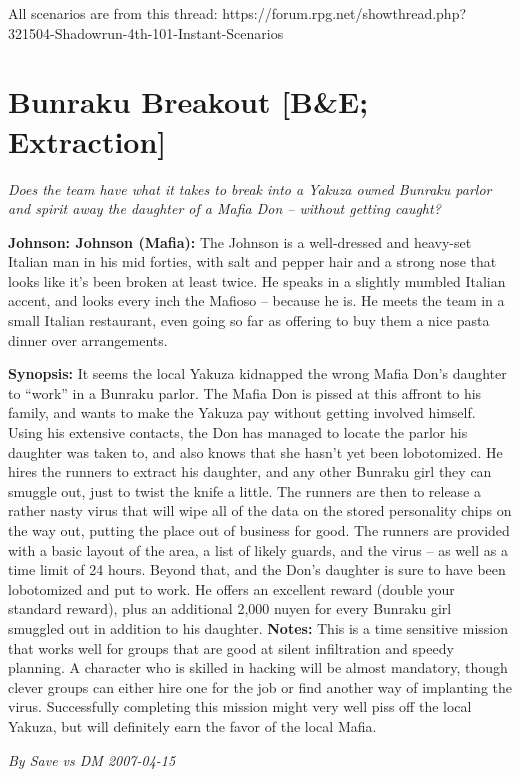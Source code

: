 \documentclass[letterpaper,twocolumn,10.5pt]{article}
\newenvironment{scenario}[6]
	{
		\section{#1 {\small[#2]}}
		\textit{#3}
		\def\TMPSCENARIO{#4 #5}
	}
	{\small\textit{By \TMPSCENARIO}}
\newcommand{\johnson}[2]{\textbf{Johnson: #1 (#2):}}
\newcommand{\synopsis}{\textbf{Synopsis: }}
\newcommand{\notes}{\textbf{Notes: }}
\begin{document}
All scenarios are from this thread: https://forum.\allowbreak{}rpg.\allowbreak{}net/\allowbreak{}showthread.\allowbreak{}php?\allowbreak{}321504-\allowbreak{}Shadowrun-\allowbreak{}4th-\allowbreak{}101-\allowbreak{}Instant-\allowbreak{}Scenarios

\tableofcontents

\begin{scenario}{Bunraku Breakout}
	{B\&E; Extraction}
	{Does the team have what it takes to break into a Yakuza owned Bunraku parlor and spirit away the daughter of a Mafia Don – without getting caught?}
	{Save vs DM}
	{2007-04-15}
	{https://forum.rpg.net/showthread.php?321504-Shadowrun-4th-101-Instant-Scenarios\&p=7171841#post7171841}

\johnson{Johnson}{Mafia} The Johnson is a well-dressed and heavy-set Italian man in his mid forties, with salt and pepper hair and a strong nose that looks like it’s been broken at least twice. He speaks in a slightly mumbled Italian accent, and looks every inch the Mafioso – because he is. He meets the team in a small Italian restaurant, even going so far as offering to buy them a nice pasta dinner over arrangements.

\synopsis It seems the local Yakuza kidnapped the wrong Mafia Don’s daughter to “work” in a Bunraku parlor. The Mafia Don is pissed at this affront to his family, and wants to make the Yakuza pay without getting involved himself. Using his extensive contacts, the Don has managed to locate the parlor his daughter was taken to, and also knows that she hasn’t yet been lobotomized. He hires the runners to extract his daughter, and any other Bunraku girl they can smuggle out, just to twist the knife a little. The runners are then to release a rather nasty virus that will wipe all of the data on the stored personality chips on the way out, putting the place out of business for good. The runners are provided with a basic layout of the area, a list of likely guards, and the virus – as well as a time limit of 24 hours. Beyond that, and the Don’s daughter is sure to have been lobotomized and put to work. He offers an excellent reward (double your standard reward), plus an additional 2,000 nuyen for every Bunraku girl smuggled out in addition to his daughter.
\notes  This is a time sensitive mission that works well for groups that are good at silent infiltration and speedy planning. A character who is skilled in hacking will be almost mandatory, though clever groups can either hire one for the job or find another way of implanting the virus. Successfully completing this mission might very well piss off the local Yakuza, but will definitely earn the favor of the local Mafia.

\end{scenario}
\end{document}
